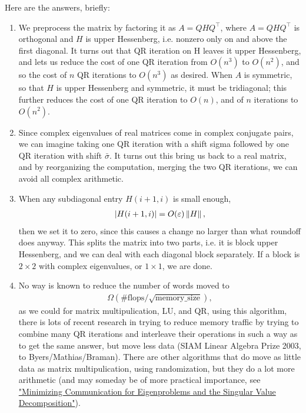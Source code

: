 \documentclass[11pt]{article}
\numberwithin{equation}{section}
\begin{document}
Here are the answers, briefly:\begin{enumerate}
    \item We preprocess the matrix by factoring it as $A=Q H Q^{\top}$, where $A=Q H Q^{\top}$ is orthogonal and $H$ is upper Hessenberg, i.e. 
    nonzero only on and above the first diagonal. It turns out that QR iteration on H leaves it upper Hessenberg, and lets us reduce
    the cost of one QR iteration from $O(n^3)$ to $O(n^2)$, and so the cost of $n$ QR iterations to $O(n^3)$ as desired. When $A$ is symmetric, 
    so that $H$ is upper Hessenberg and symmetric, it must be tridiagonal; this further reduces the cost of one QR iteration to $O(n)$, 
    and of $n$ iterations to $O(n^2)$.
    \item Since complex eigenvalues of real matrices come in complex conjugate pairs, 
    we can imagine taking one QR iteration with a shift sigma followed by one QR iteration with shift $\bar{\sigma}$. 
    It turns out this bring us back to a real matrix, and by reorganizing the computation, merging the two QR iterations, we can avoid all complex arithmetic.
    \item When any subdiagonal entry $H(i+1,i)$ is small enough, \begin{align*}
        |H(i+1,i)| = O(\varepsilon)\left\| H \right\|,
    \end{align*}
    then we set it to zero, since this causes a change no larger than what roundoff does anyway. This splits the matrix into two parts, i.e. 
    it is block upper Hessenberg, and we can deal with each diagonal block separately. If a block is $2 \times 2$ with complex eigenvalues, or $1\times 1$, 
    we are done.
    \item No way is known to reduce the number of words moved to
    \begin{align*}
        \Omega(\#\mathrm{flops}/\sqrt{\mathrm{memory\_size}}),
    \end{align*}
    as we could for matrix multipulication, LU, and QR, using this algorithm, 
    there is lots of recent research in trying to reduce memory traffic by trying to combine many QR iterations and interleave their operations in such a way
    as to get the same answer, but move less data (SIAM Linear Algebra Prize 2003, to Byers/Mathias/Braman).
    There are other algorithms that do move as little data as matrix multipulication, using randomization, but they do a lot more arithmetic (and may someday be 
    of more practical importance, see \href{https://arxiv.org/pdf/1011.3077.pdf}{"Minimizing Communication for Eigenproblems and the Singular Value Decomposition"}).
\end{enumerate}
\end{document}
